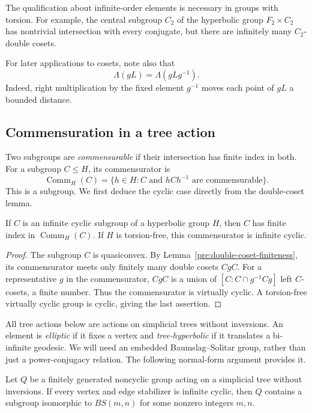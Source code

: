 The qualification about infinite-order elements is necessary in groups
with torsion. For example, the central subgroup \(C_2\) of the hyperbolic
group \(F_2\times C_2\) has nontrivial intersection with every conjugate,
but there are infinitely many \(C_2\)-double cosets.

For later applications to cosets, note also that
\[
  \Lambda(gL)=\Lambda(gLg^{-1}).
\]
Indeed, right multiplication by the fixed element \(g^{-1}\) moves each
point of \(gL\) a bounded distance.

\subsection{Commensuration in a tree action}

Two subgroups are \emph{commensurable} if their intersection has finite
index in both. For a subgroup \(C\leq H\), its commensurator is
\[
  \operatorname{Comm}_H(C)
  =\{h\in H: C\text{ and }hCh^{-1}\text{ are commensurable}\}.
\]
This is a subgroup. We first deduce the cyclic case directly from the
double-coset lemma.

\begin{lemma}
\label{pre:cyclic-commensurator}
If \(C\) is an infinite cyclic subgroup of a hyperbolic group \(H\), then
\(C\) has finite index in \(\operatorname{Comm}_H(C)\).
If \(H\) is torsion-free, this commensurator is infinite cyclic.
\end{lemma}

\begin{proof}
The subgroup \(C\) is quasiconvex. By
Lemma~\ref{pre:double-coset-finiteness}, its commensurator meets only
finitely many double cosets \(CgC\). For a representative \(g\) in the
commensurator, \(CgC\) is a union of
\([C:C\cap g^{-1}Cg]\) left \(C\)-cosets, a finite number. Thus the
commensurator is virtually cyclic. A torsion-free virtually cyclic group
is cyclic, giving the last assertion.
\end{proof}

All tree actions below are actions on simplicial trees without
inversions. An element is \emph{elliptic} if it fixes a vertex and
\emph{tree-hyperbolic} if it translates a bi-infinite geodesic.
We will need an embedded Baumslag--Solitar group, rather than just a
power-conjugacy relation. The following normal-form argument provides it.

\begin{lemma}
\label{pre:gbs-subgroup}
Let \(Q\) be a finitely generated noncyclic group acting on a simplicial
tree without inversions. If every vertex and edge stabilizer is infinite
cyclic, then \(Q\) contains a subgroup isomorphic to \(BS(m,n)\) for some
nonzero integers \(m,n\).
\end{lemma}

